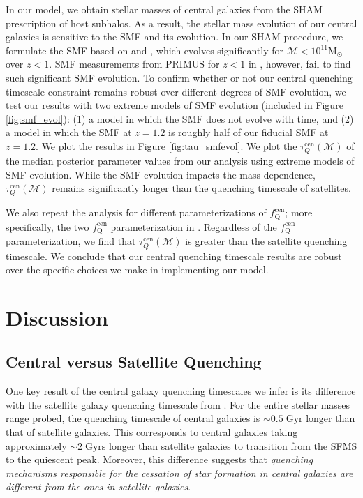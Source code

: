 \documentclass[iop,apj,tighten,twocolappendix,numberedappendix]{emulateapj}
\newcommand{\fqcen}{f_\mathrm{Q}^\mathrm{cen}}
\begin{document}
In our model, we obtain stellar masses of central galaxies 
from the SHAM prescription of host subhalos. As a result, 
the stellar mass evolution of our central galaxies is sensitive 
to the SMF and its evolution. In our SHAM procedure, we formulate 
the SMF based on \cite{Li:2009aa} and \cite{Marchesini:2009aa},
which evolves significantly for 
$\mathcal{M} < 10^{11} \mathrm{M}_\odot$ over $z < 1$. SMF measurements 
from PRIMUS for $z < 1$ in \cite{Moustakas:2013aa}, however, fail to find 
such significant SMF evolution. To confirm whether or not our 
central quenching timescale constraint remains robust over 
different degrees of SMF evolution, we test our results 
with two extreme models of SMF evolution (included in Figure 
\ref{fig:smf_evol}): (1) a model in which the SMF does not 
evolve with time, and (2) a model in which the SMF at $z = 1.2$ 
is roughly half of our fiducial SMF at $z=1.2$. We plot the 
results in Figure \ref{fig:tau_smfevol}.
We plot the $\tau^\mathrm{cen}_Q(\mathcal{M})$ of the median posterior 
parameter values from our analysis using extreme models of SMF evolution. 
While the SMF evolution impacts the mass dependence,  
$\tau^\mathrm{cen}_Q(\mathcal{M})$ remains significantly longer than the 
quenching timescale of satellites.

We also repeat the analysis for different parameterizations of 
$\fqcen$; more specifically, the two $\fqcen$ parameterization 
in \cite{Wetzel:2013aa}. Regardless of the $\fqcen$ 
parameterization, we find that $\tau^\mathrm{cen}_Q(\mathcal{M})$ is 
greater than the satellite quenching timescale. We conclude that 
our central quenching timescale results are robust over the specific 
choices we make in implementing our model.

\section{Discussion} \label{sec:discussion}
\subsection{Central versus Satellite Quenching}
One key result of the central galaxy quenching timescales we infer 
is its difference with the satellite galaxy quenching timescale from 
\cite{Wetzel:2013aa}. For the entire stellar masses range probed, 
the quenching timescale of central galaxies is $\sim 0.5\;\mathrm{Gyr}$ 
longer than that of satellite galaxies. This corresponds to central 
galaxies taking approximately $\sim 2 \;\mathrm{Gyrs}$ longer
than satellite galaxies to transition from the SFMS to the quiescent 
peak. Moreover, this difference suggests that {\em quenching 
mechanisms responsible for the cessation of star formation in central 
galaxies are different from the ones in satellite galaxies}. 
\end{document}
